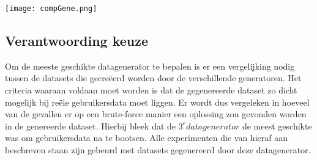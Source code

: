 \documentclass[Main.tex]{subfiles}
\begin{document}
\texttt{[image: compGene.png]} %

\subsection{Verantwoording keuze}
Om de meeste geschikte datagenerator te bepalen is er een vergelijking nodig tussen de datasets die gecre\"eerd worden door de verschillende generatoren. Het criteria waaraan voldaan moet worden is dat de gegenereerde dataset zo dicht mogelijk bij re\"ele gebruikersdata moet liggen. Er wordt dus vergeleken in hoeveel van de gevallen er op een brute-force manier een oplossing zou gevonden worden in de genereerde dataset. Hierbij bleek dat de $3^{e} datagenerator$ de meest geschikte was om gebruikersdata na te bootsen. Alle experimenten die van hieraf aan beschreven staan zijn gebeurd met datasets gegenereerd door deze datagenerator.
\end{document}
